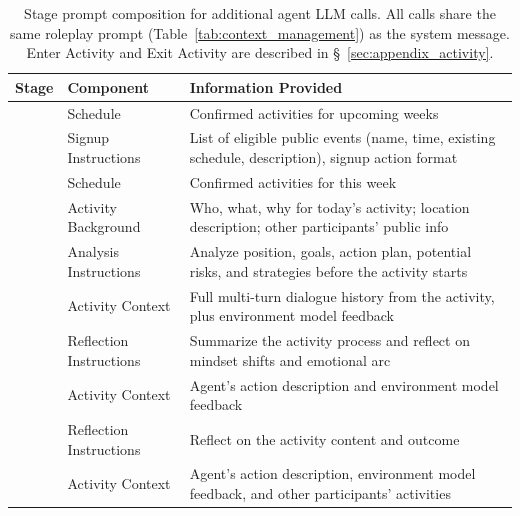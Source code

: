 \begin{table}[htbp]
  \centering
  \caption{Stage prompt composition for additional agent LLM calls. All calls share the same roleplay prompt (Table~\ref{tab:context_management}) as the system message. Enter Activity and Exit Activity are described in \S~\ref{sec:appendix_activity}.}
  \label{tab:additional_stages}
  \small
  \begin{tabular}{p{2.8cm} p{3.0cm} p{7.2cm}}
    \toprule
    \textbf{Stage} & \textbf{Component} & \textbf{Information Provided} \\
    \midrule
      & Schedule         & Confirmed activities for upcoming weeks \\
      & Signup Instructions & List of eligible public events (name, time, existing schedule, description), signup action format \\
    \midrule
      & Schedule         & Confirmed activities for this week \\
      & Activity Background & Who, what, why for today's activity; location description; other participants' public info \\
      & Analysis Instructions & Analyze position, goals, action plan, potential risks, and strategies before the activity starts \\
    \midrule
      & Activity Context  & Full multi-turn dialogue history from the activity, plus environment model feedback \\
      & Reflection Instructions & Summarize the activity process and reflect on mindset shifts and emotional arc \\
    \midrule
      & Activity Context  & Agent's action description and environment model feedback \\
      & Reflection Instructions & Reflect on the activity content and outcome \\
    \midrule
      & Activity Context  & Agent's action description, environment model feedback, and other participants' activities \\

\end{tabular}
\end{table}
